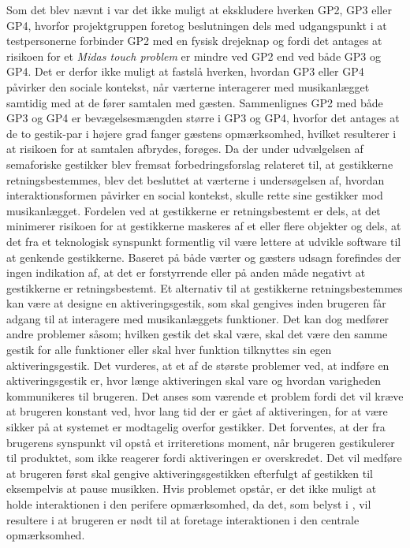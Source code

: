 Som det blev nævnt i  var det ikke muligt at ekskludere hverken GP2, GP3 eller GP4, hvorfor projektgruppen foretog beslutningen dels med udgangspunkt i at testpersonerne forbinder GP2 med en fysisk drejeknap og fordi det antages at risikoen for et \textit{Midas touch problem} er mindre ved GP2 end ved både GP3 og GP4. Det er derfor ikke muligt at fastslå hverken, hvordan GP3 eller GP4 påvirker den sociale kontekst, når værterne interagerer med musikanlægget samtidig med at de fører samtalen med gæsten. Sammenlignes GP2 med både GP3 og GP4 er bevægelsesmængden større i GP3 og GP4, hvorfor det antages at de to gestik-par i højere grad fanger gæstens opmærksomhed, hvilket resulterer i at risikoen for at samtalen afbrydes, forøges.\blankline
%
Da der under udvælgelsen af semaforiske gestikker blev fremsat forbedringsforslag relateret til, at gestikkerne retningsbestemmes, blev det besluttet at værterne i undersøgelsen af, hvordan interaktionsformen påvirker en social kontekst, skulle rette sine gestikker mod musikanlægget. Fordelen ved at gestikkerne er retningsbestemt er dels, at det minimerer risikoen for at gestikkerne maskeres af et eller flere objekter og dels, at det fra et teknologisk synspunkt formentlig vil være lettere at udvikle software til at genkende gestikkerne. Baseret på både værter og gæsters udsagn forefindes der ingen indikation af, at det er forstyrrende eller på anden måde negativt at gestikkerne er retningsbestemt. Et alternativ til at gestikkerne retningsbestemmes kan være at designe en aktiveringsgestik, som skal gengives inden brugeren får adgang til at interagere med musikanlæggets funktioner. Det kan dog medfører andre problemer såsom; hvilken gestik det skal være, skal det være den samme gestik for alle funktioner eller skal hver funktion tilknyttes sin egen aktiveringsgestik. Det vurderes, at et af de største problemer ved, at indføre en aktiveringsgestik er, hvor længe aktiveringen skal vare og hvordan varigheden kommunikeres til brugeren. Det anses som værende et problem fordi det vil kræve at brugeren konstant ved, hvor lang tid der er gået af aktiveringen, for at være sikker på at systemet er modtagelig overfor gestikker. Det forventes, at der fra brugerens synspunkt vil opstå et irriteretions moment, når brugeren gestikulerer til produktet, som ikke reagerer fordi aktiveringen er overskredet. Det vil medføre at brugeren først skal gengive aktiveringsgestikken efterfulgt af gestikken til eksempelvis at pause musikken. Hvis problemet opstår, er det ikke muligt at holde interaktionen i den perifere opmærksomhed, da det, som belyst i , vil resultere i at brugeren er nødt til at foretage interaktionen i den centrale opmærksomhed. 

